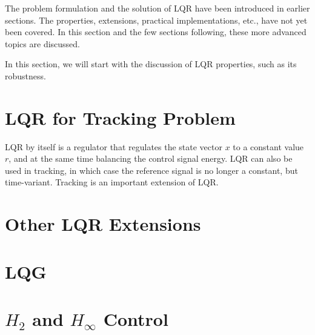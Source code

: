 The problem formulation and the solution of LQR have been introduced in earlier sections. The properties, extensions, practical implementations, etc., have not yet been covered. In this section and the few sections following, these more advanced topics are discussed.

In this section, we will start with the discussion of LQR properties, such as its robustness.

\section{LQR for Tracking Problem}

LQR by itself is a regulator that regulates the state vector $x$ to a constant value $r$, and at the same time balancing the control signal energy. LQR can also be used in tracking, in which case the reference signal is no longer a constant, but time-variant. Tracking is an important extension of LQR.

 















\section{Other LQR Extensions}






























 

\section{LQG}

\section{$H_2$ and $H_\infty$ Control} 